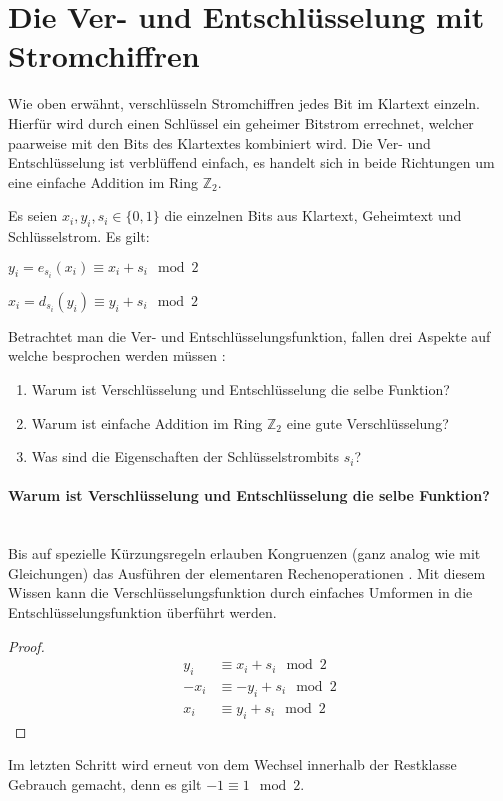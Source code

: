 \section{Die Ver- und Entschlüsselung mit Stromchiffren}
Wie oben erwähnt, verschlüsseln Stromchiffren jedes Bit im Klartext einzeln. Hierfür
wird durch einen Schlüssel ein geheimer Bitstrom errechnet, welcher paarweise mit den Bits
des Klartextes kombiniert wird. Die Ver- und Entschlüsselung ist verblüffend einfach, es handelt
sich in beide Richtungen um eine einfache Addition im Ring $\mathbb{Z}_2$.

\begin{definition}
  Es seien $x_i,y_i,s_i \in \{0,1\}$ die einzelnen Bits aus Klartext, Geheimtext und Schlüs\-selstrom.
  Es gilt:
  \begin{description}[itemsep = 0pt]
    \item[Verschlüsselung:] $y_i = e_{s_i}(x_i) \equiv x_i + s_i \mod{2}$
    \item[Entschlüsselung:] $x_i = d_{s_i}(y_i) \equiv y_i + s_i \mod{2}$
  \end{description}
\end{definition}

\noindent
Betrachtet man die Ver- und Entschlüsselungsfunktion, fallen drei Aspekte auf welche
besprochen werden müssen \parencite[31-34]{BOOK:crypto}:

\begin{enumerate}[itemsep = 0pt]
  \item Warum ist Verschlüsselung und Entschlüsselung die selbe Funktion?
  \item Warum ist einfache Addition im Ring $\mathbb{Z}_2$ eine gute Verschlüsselung?
  \item Was sind die Eigenschaften der Schlüsselstrombits $s_i$?
\end{enumerate}

\paragraph{Warum ist Verschlüsselung und Entschlüsselung die selbe Funktion?}\mbox{}\\
Bis auf spezielle Kürzungsregeln erlauben Kongruenzen (ganz analog wie mit Gleichungen)
das Ausführen der elementaren Rechenoperationen \parencite[181-183]{BOOK:numberTheory}.
Mit diesem Wissen kann die Verschlüsselungsfunktion durch einfaches Umformen in die
Entschlüsselungsfunktion überführt werden.
\begin{proof}
  \begin{align*}
    y_i  & \equiv x_i + s_i \mod{2}  \\
    -x_i & \equiv -y_i + s_i \mod{2} \\
    x_i  & \equiv y_i + s_i \mod{2}
  \end{align*}
\end{proof}
\noindent
Im letzten Schritt wird erneut von dem Wechsel innerhalb der Restklasse Gebrauch gemacht,
denn es gilt $-1 \equiv 1 \mod{2}$.

